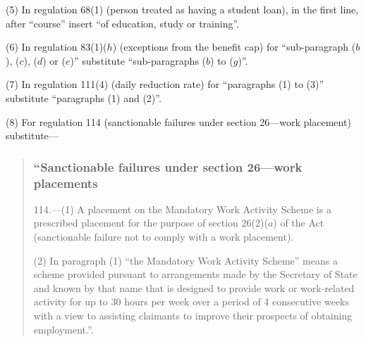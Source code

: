 \documentclass[12pt,a4paper]{article}
\begin{document}
(5) In regulation 68(1) (person treated as having a student loan), in the first line, after “course” insert “of education, study or training”.

(6) In regulation 83(1)($h$)  (exceptions from the benefit cap) for “sub-paragraph ($b$), ($c$), ($d$)  or ($e$)” substitute “sub-paragraphs ($b$)  to ($g$)”.

(7) In regulation 111(4) (daily reduction rate) for “paragraphs (1) to (3)” substitute “paragraphs (1) and (2)”.

(8) For regulation 114 (sanctionable failures under section 26---work placement) substitute—
\begin{quotation}
\subsubsection*{\sloppy “Sanctionable failures under section 26---work placements}

114.—(1) A placement on the Mandatory Work Activity Scheme is a prescribed placement for the purpose of section 26(2)($a$)  of the Act (sanctionable failure not to comply with a work placement).

(2) In paragraph (1) “the Mandatory Work Activity Scheme” means a scheme provided pursuant to arrangements made by the Secretary of State and known by that name that is designed to provide work or work-related activity for up to 30 hours per week over a period of 4 consecutive weeks with a view to assisting claimants to improve their prospects of obtaining employment.”.
\end{quotation}
\end{document}
